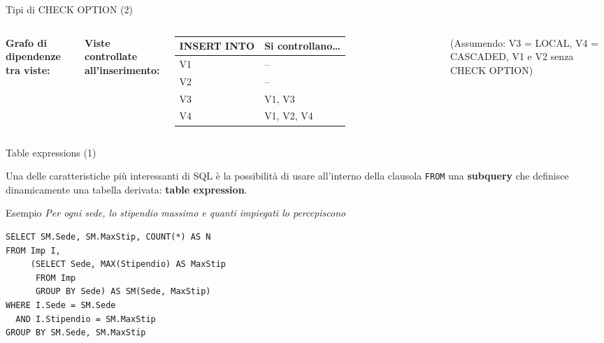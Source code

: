 \documentclass[aspectratio=169]{beamer}
\begin{document}
\begin{frame}{Tipi di CHECK OPTION (2)}

\begin{columns}[T]
\textbf{Grafo di dipendenze tra viste:}

\vspace{12pt}

\textbf{Viste controllate all'inserimento:}\\[8pt]
\small
\begin{tabular}{|l|l|}
\hline
\textbf{INSERT INTO} & \textbf{Si controllano\ldots}\\
\hline
V1 & -- \\
V2 & -- \\
V3 & V1, V3 \\
V4 & V1, V2, V4 \\
\hline
\end{tabular}

\vspace{10pt}
\footnotesize
(Assumendo: V3 = LOCAL, V4 = CASCADED, V1 e V2 senza CHECK OPTION)
\end{columns}

\end{frame}

\begin{frame}[fragile]{Table expressions (1)}

Una delle caratteristiche più interessanti di SQL è la possibilità di usare all'interno della clausola \texttt{FROM} una \textbf{subquery} che definisce dinamicamente una tabella derivata: \textbf{table expression}.

\begin{block}{Esempio}
\textit{Per ogni sede, lo stipendio massimo e quanti impiegati lo percepiscono}
\end{block}

\begin{lstlisting}
SELECT SM.Sede, SM.MaxStip, COUNT(*) AS N
FROM Imp I,
     (SELECT Sede, MAX(Stipendio) AS MaxStip
      FROM Imp
      GROUP BY Sede) AS SM(Sede, MaxStip)
WHERE I.Sede = SM.Sede
  AND I.Stipendio = SM.MaxStip
GROUP BY SM.Sede, SM.MaxStip
\end{lstlisting}

\end{frame}
\end{document}
